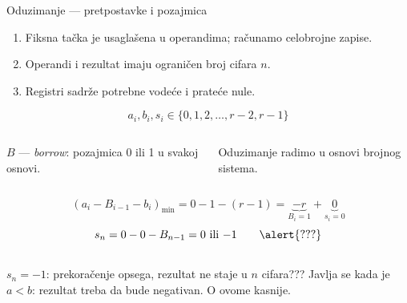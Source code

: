 \begin{frame}[label=05-s019]{Oduzimanje — pretpostavke i pozajmica}
\fontsize{10}{12}\selectfont\setlength{\abovedisplayskip}{3pt}\setlength{\belowdisplayskip}{3pt}\setlength{\parskip}{1pt}
\begin{enumerate}
\item Fiksna tačka je usaglašena u operandima; računamo celobrojne zapise.
\item Operandi i rezultat imaju ograničen broj cifara $n$.
\item Registri sadrže potrebne vodeće i prateće nule.
\end{enumerate}
\[a_i,b_i,s_i\in\{0,1,2,\ldots,r-2,r-1\}\]
\begin{columns}[c,onlytextwidth]
\centering
{}$B$ — \textit{borrow}: pozajmica 0 ili 1 u svakoj osnovi.\par
Oduzimanje radimo u osnovi brojnog sistema.
\end{columns}
\[(a_i-B_{i-1}-b_i)_{\min}=0-1-(r-1)=\underbrace{-r}_{B_i=1}+\underbrace{0}_{s_i=0}\]
\[s_n=0-0-B_{n-1}=0\ \text{ili}\ {-1}\qquad\alert{???}\]
\begin{columns}[c,onlytextwidth]
\alert{$s_n=-1$: prekoračenje opsega, rezultat ne staje u $n$ cifara???}
Javlja se kada je $a<b$: rezultat treba da bude negativan. O ovome kasnije.
\end{columns}
\end{frame}

